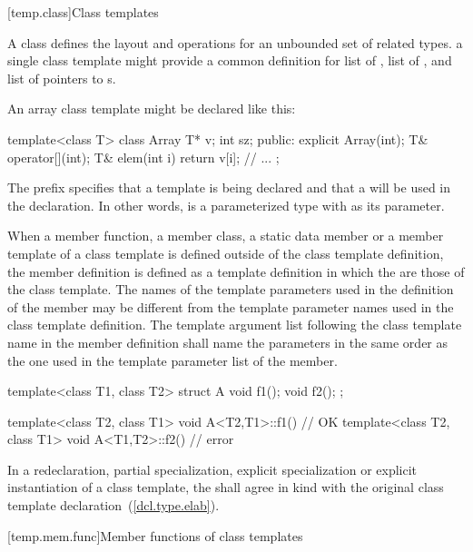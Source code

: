[temp.class]{Class templates}

\pnum
A class
defines the layout and operations
for an unbounded set of related types.
\enterexample
a single class template
might provide a common definition for
list of
,
list of
,
and list of pointers to
s.
\exitexample

\pnum
\enterexample
An array class template might be declared like this:

\begin{codeblock}
template<class T> class Array {
    T* v;
    int sz;
public:
    explicit Array(int);
    T& operator[](int);
    T& elem(int i) { return v[i]; }
    // ...
};
\end{codeblock}

The prefix
specifies that a template is being declared and that a
will be used in the declaration.
In other words,
is a parameterized type with
as its parameter.
\exitexample

\pnum
When a member function, a member class, a static data member or
a member template of a class
template is defined outside of the class template definition,
the member definition is defined as a template definition in which the
are those of the class template.
The names of the template parameters used in the definition of the member may
be different from the template parameter names used in the class
template definition.
The template argument list following the class template name in the member
definition shall name the parameters in the same order as the one used in
the template parameter list of the member.
\enterexample

\begin{codeblock}
template<class T1, class T2> struct A {
    void f1();
    void f2();
};

template<class T2, class T1> void A<T2,T1>::f1() { }    // OK
template<class T2, class T1> void A<T1,T2>::f2() { }    // error
\end{codeblock}

\exitexampleb

\pnum
In a redeclaration, partial
specialization,
explicit specialization or explicit
instantiation of a class template, the
shall agree in kind with the original class template declaration~(\ref{dcl.type.elab}).

[temp.mem.func]{Member functions of class templates}

